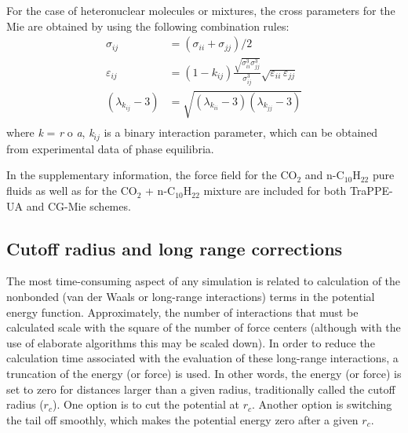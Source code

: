 \documentclass[9pt,bestpractices]{livecoms}
\begin{document}
\begin{mdframed}[linewidth=0pt,backgroundcolor=LiveCoMSLightBlue!8,fontcolor=LiveCoMSDarkBlue!80!black]
For the case of heteronuclear molecules or mixtures, the cross parameters for the Mie are obtained by using the following combination rules:
\begin{align}
  \sigma_{ij} &= \left(\sigma_{ii}+\sigma_{jj}\right)/2 \\
  \varepsilon_{ij} &= \left(1-k_{ij}\right)\frac{\sqrt{\sigma_{ii}^{3}\sigma_{jj}^{3}}}{\sigma_{ij}^{3}}\sqrt{\varepsilon_{ii}\,\varepsilon_{jj}} \\
  \left(\lambda_{k_{ij}}-3\right) &= \sqrt{\left(\lambda_{k_{ii}}-3\right)\left(\lambda_{k_{jj}}-3\right)} \\
\end{align}
where \textit{k} = \textit{r} o \textit{a}, \textit{k}$_{ij}$ is a binary
interaction parameter, which can be obtained from experimental data of phase
equilibria.

In the supplementary information, the force field for the CO$_{2}$ and
n-C$_{10}$H$_{22}$ pure fluids as well as for the CO$_{2}$ + n-C$_{10}$H$_{22}$
mixture are included for both TraPPE-UA and CG-Mie schemes.
\end{mdframed}

\subsection{Cutoff radius and long range corrections} 
\label{sec:cutoff}
The most time-consuming aspect of any simulation is related to calculation of the nonbonded (van
der Waals or long-range interactions) terms in the potential energy function.
Approximately, the number of interactions that must be calculated scale with
the square of the number of force centers (although with the use of elaborate
algorithms this may be scaled down). In order to reduce the calculation time
associated with the evaluation of these long-range interactions, a truncation
of the energy (or force) is used. In other words, the energy (or force) is set
to zero for distances larger than a given radius, traditionally called the
cutoff radius ($r_c$). One option is to cut the potential at $r_c$. Another 
option is switching the tail off smoothly, which makes the potential energy zero after
a given $r_c$. 
\end{document}
